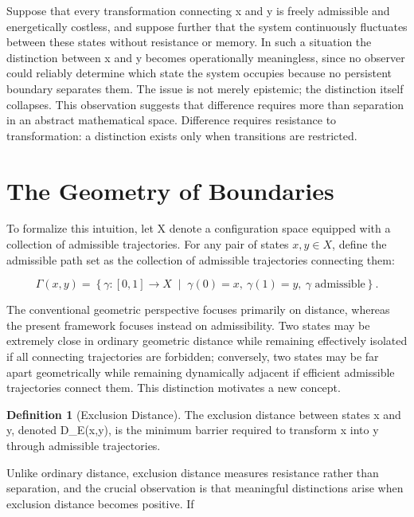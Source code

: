 \documentclass[11pt,oneside]{book}
\theoremstyle{plain}
\theoremstyle{definition}
\newtheorem{definition}[theorem]{Definition}
\theoremstyle{remark}
\begin{document}
Suppose that every transformation connecting x and y is freely admissible and energetically costless, and suppose further that the system continuously fluctuates between these states without resistance or memory. In such a situation the distinction between x and y becomes operationally meaningless, since no observer could reliably determine which state the system occupies because no persistent boundary separates them. The issue is not merely epistemic; the distinction itself collapses. This observation suggests that difference requires more than separation in an abstract mathematical space. Difference requires resistance to transformation: a distinction exists only when transitions are restricted.

\section{The Geometry of Boundaries}

To formalize this intuition, let X denote a configuration space equipped with a collection of admissible trajectories. For any pair of states \(x,y \in X\), define the admissible path set as the collection of admissible trajectories connecting them:

\begin{equation}
\Gamma(x,y)
=
\left\{
\gamma:[0,1]\rightarrow X
\;\middle|\;
\gamma(0)=x,
\
\gamma(1)=y,
\
\gamma
\text{ admissible}
\right\}.
\end{equation}

The conventional geometric perspective focuses primarily on distance, whereas the present framework focuses instead on admissibility. Two states may be extremely close in ordinary geometric distance while remaining effectively isolated if all connecting trajectories are forbidden; conversely, two states may be far apart geometrically while remaining dynamically adjacent if efficient admissible trajectories connect them. This distinction motivates a new concept.

\begin{definition}[Exclusion Distance]
The exclusion distance between states x and y, denoted D_E(x,y), is the minimum barrier required to transform x into y through admissible trajectories.
\end{definition}

Unlike ordinary distance, exclusion distance measures resistance rather than separation, and the crucial observation is that meaningful distinctions arise when exclusion distance becomes positive. If
\end{document}
